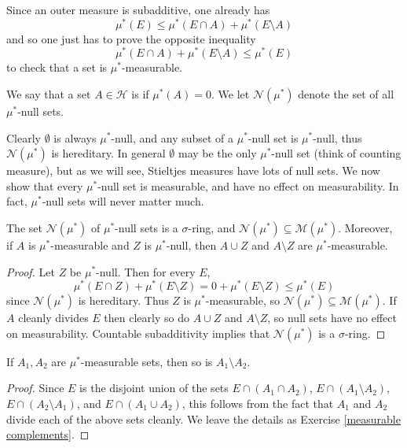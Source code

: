 \begin{subsec}
Since an outer measure is subadditive, one already has
\[\mu^*(E) \leq \mu^*(E \cap A) + \mu^*(E \setminus A)\]
and so one just has to prove the opposite inequality
\begin{equation}
\label{Caratheodory inequality}
\mu^*(E \cap A) + \mu^*(E \setminus A) \leq \mu^*(E)
\end{equation}
to check that a set is $\mu^*$-measurable.
\end{subsec}

\begin{definition}
We say that a set $A \in \mathcal H$ is  if $\mu^*(A) = 0$.
We let $\mathcal N(\mu^*)$ denote the set of all $\mu^*$-null sets.
\end{definition}

\begin{subsec}
Clearly $\emptyset$ is always $\mu^*$-null, and any subset of a $\mu^*$-null set is $\mu^*$-null, thus $\mathcal N(\mu^*)$ is hereditary.
In general $\emptyset$ may be the only $\mu^*$-null set (think of counting measure), but as we will see, Stieltjes measures have lots of null sets.
We now show that every $\mu^*$-null set is measurable, and have no effect on measurability.
In fact, $\mu^*$-null sets will never matter much.
\end{subsec}

\begin{lemma}
The set $\mathcal N(\mu^*)$ of $\mu^*$-null sets is a $\sigma$-ring, and $\mathcal N(\mu^*) \subseteq \mathcal M(\mu^*)$.
Moreover, if $A$ is $\mu^*$-measurable and $Z$ is $\mu^*$-null, then $A \cup Z$ and $A \setminus Z$ are $\mu^*$-measurable.
\end{lemma}
\begin{proof}
Let $Z$ be $\mu^*$-null. Then for every $E$,
\[\mu^*(E \cap Z) + \mu^*(E \setminus Z) = 0 + \mu^*(E \setminus Z) \leq \mu^*(E)\]
since $\mathcal N(\mu^*)$ is hereditary.
Thus $Z$ is $\mu^*$-measurable, so $\mathcal N(\mu^*) \subseteq \mathcal M(\mu^*)$.
If $A$ cleanly divides $E$ then clearly so do $A \cup Z$ and $A \setminus Z$, so null sets have no effect on measurability.
Countable subadditivity implies that $\mathcal N(\mu^*)$ is a $\sigma$-ring.
\end{proof}

\begin{lemma}
\label{measurable complements lemma}
If $A_1, A_2$ are $\mu^*$-measurable sets, then so is $A_1 \setminus A_2$.
\end{lemma}
\begin{proof}
Since $E$ is the disjoint union of the sets $E \cap (A_1 \cap A_2)$, $E \cap (A_1 \setminus A_2)$, $E \cap (A_2 \setminus A_1)$, and $E \cap (A_1 \cup A_2)$, this follows from the fact that $A_1$ and $A_2$ divide each of the above sets cleanly.
We leave the details as Exercise \ref{measurable complements}.
\end{proof}

